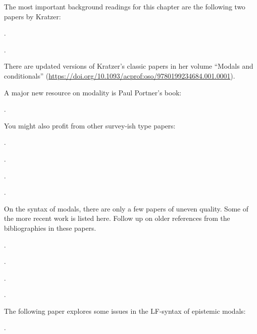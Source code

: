 {\setlength{\parindent}{0pt}\setlength{\parskip}{6pt}

  The most important background readings for this chapter are the
  following two papers by Kratzer:

\begin{bibentrylist}
	\item {}.
	\item {}.
\end{bibentrylist}

There are updated versions of Kratzer's classic papers in her volume ``Modals
and conditionals''
(\url{https://doi.org/10.1093/acprof:oso/9780199234684.001.0001}).

A major new resource on modality is Paul Portner's book:

\begin{bibentrylist}
  \item{}.
\end{bibentrylist}

You might also profit from other survey-ish type papers:

\begin{bibentrylist}
  \item {}.
  \item {}.
  \item {}.
  \item {}.
\end{bibentrylist}

On the syntax of modals, there are only a few papers of uneven
quality. Some of the more recent work is listed here. Follow up on
older references from the bibliographies in these papers.

\begin{bibentrylist}
	\item {}. 
	\item {}. 
	\item {}. 
	\item {}. 
\end{bibentrylist}

The following paper explores some issues in the LF-syntax of epistemic
modals:

\begin{bibentrylist}
	\item {}.
\end{bibentrylist}

}
